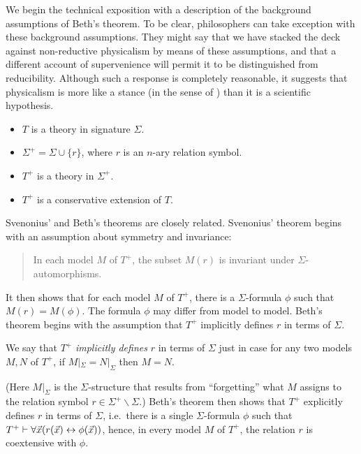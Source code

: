 We begin the technical exposition with a description of the background
assumptions of Beth's theorem.  To be clear, philosophers can take
exception with these background assumptions.  They might say that we
have stacked the deck against non-reductive physicalism by means of
these assumptions, and that a different account of supervenience will
permit it to be distinguished from reducibility.  Although such a
response is completely reasonable, it suggests that physicalism is
more like a stance (in the sense of \cite{stance}) than it is a
scientific hypothesis.

\begin{box-thm}
  \begin{itemize}
  \item $T$ is a theory in signature $\Sigma$.
   \item $\Sigma ^+=\Sigma \cup \{ r\}$, where $r$ is an $n$-ary
     relation symbol.
   \item $T^+$ is a theory in $\Sigma ^+$.
   \item $T^+$ is a conservative extension of $T$.
  \end{itemize}
\end{box-thm}

Svenonius' and Beth's theorems are closely related.  Svenonius'
theorem begins with an assumption about symmetry and invariance:
\begin{quote} In each model $M$ of $T^+$, the subset $M(r)$ is
  invariant under $\Sigma$-automorphisms. \end{quote} It then shows
that for each model $M$ of $T^+$, there is a $\Sigma$-formula $\phi$
such that $M(r)=M(\phi )$.  The formula $\phi$ may differ from model
to model.  Beth's theorem begins with the assumption that $T^+$
implicitly defines $r$ in terms of $\Sigma$.
\begin{defn} We say that $T^+$ \emph{implicitly defines} $r$ in terms
  of $\Sigma$ just in case for any two models $M,N$ of $T^+$, if
  $M|_{\Sigma}=N|_{\Sigma}$ then $M=N$. \end{defn} \noindent (Here
$M|_\Sigma$ is the $\Sigma$-structure that results from ``forgetting''
what $M$ assigns to the relation symbol
$r\in \Sigma ^+\backslash\Sigma$.)  Beth's theorem then shows that
$T^+$ explicitly defines $r$ in terms of $\Sigma$, i.e.\ there is a
single $\Sigma$-formula $\phi$ such that
$T^+\vdash \forall \vec{x}(r(\vec{x})\leftrightarrow \phi (\vec{x}))$, hence, in
every model $M$ of $T^+$, the relation $r$ is coextensive with $\phi$.

